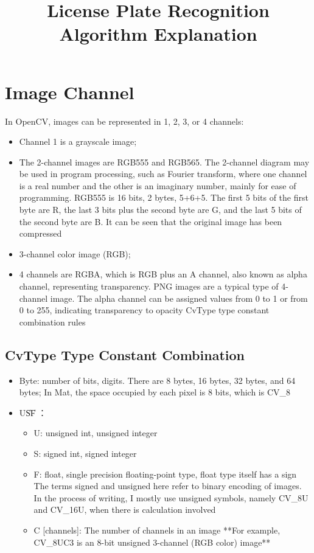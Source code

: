 \documentclass{article}
\title{License Plate Recognition Algorithm Explanation}
\begin{document}
	\maketitle
	
	\section{Image Channel}
	In OpenCV, images can be represented in 1, 2, 3, or 4 channels:
	\begin{itemize}
		\item Channel 1 is a grayscale image;
		\item The 2-channel images are RGB555 and RGB565. The 2-channel diagram may be used in program processing, such as Fourier transform, where one channel is a real number and the other is an imaginary number, mainly for ease of programming. RGB555 is 16 bits, 2 bytes, 5+6+5. The first 5 bits of the first byte are R, the last 3 bits plus the second byte are G, and the last 5 bits of the second byte are B. It can be seen that the original image has been compressed
		\item 3-channel color image (RGB);
		\item 4 channels are RGBA, which is RGB plus an A channel, also known as alpha channel, representing transparency. PNG images are a typical type of 4-channel image. The alpha channel can be assigned values from 0 to 1 or from 0 to 255, indicating transparency to opacity
		CvType type constant combination rules
	\end{itemize}
	
	\subsection{CvType Type Constant Combination}
	\begin{itemize}
		\item Byte: number of bits, digits. There are 8 bytes, 16 bytes, 32 bytes, and 64 bytes; In Mat, the space occupied by each pixel is 8 bits, which is CV\_8
		\item U\|S\|F ：
		\begin{itemize}
			\item U: unsigned int, unsigned integer
			\item S: signed int, signed integer
			\item F: float, single precision floating-point type, float type itself has a sign
			The terms signed and unsigned here refer to binary encoding of images. In the process of writing, I mostly use unsigned symbols, namely CV\_8U and CV\_16U, when there is calculation involved
			\item C [channels]: The number of channels in an image
			**For example, CV\_8UC3 is an 8-bit unsigned 3-channel (RGB color) image**
		\end{itemize}
	\end{itemize}
	
\end{document}
